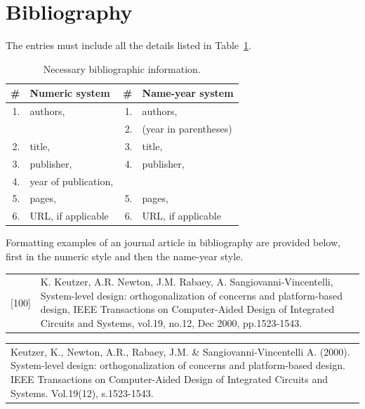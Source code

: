 \documentclass[12pt,a4paper,english
]{tunithesis}
\begin{document}
\section{Bibliography}
The entries must include all the details listed in Table~\ref{tab:bibl}.
\begin{table}[!ht]
  \small
  \begin{center}
    \caption{Necessary bibliographic information.}
    \label{tab:bibl}
    \begin{tabular}{r l | r l }
\hline 
\textbf{\#}  
   & \textbf{Numeric system}
                       & \textbf{\#}  
                                & \textbf{Name-year system}\\
\hline
\hline
1. &	authors,	   & 1. & authors,  \\
   &                       & 2. & (year in parentheses) \\
2. &	title,             & 3.	& title,    \\
3. &	publisher,         & 4.	& publisher,\\
4. &	year of publication, &  &	 \\
5. &	pages,             & 5.  & pages, \\
6. &	URL, if applicable & 6.	& URL, if applicable    \\
      \hline
    \end{tabular}
  \end{center}
\end{table}


Formatting examples of an journal article in bibliography are provided
below, first in the numeric style and then the name-year style.

\begin{tabular}{p{1cm}p{12cm}}
\small
[100] & K. Keutzer, A.R. Newton, J.M. Rabaey,
A. Sangiovanni-Vincentelli, System-level design: orthogonalization of
concerns and platform-based design, IEEE Transactions on
Computer-Aided Design of Integrated Circuits and Systems, vol.19,
no.12, Dec 2000, pp.1523-1543.\\
\end{tabular}

\begin{tabular}{p{13cm}}
\small
Keutzer, K., Newton, A.R., Rabaey, J.M. \& Sangiovanni-Vincentelli
A. (2000). System-level design: orthogonalization of concerns and
platform-based design. IEEE Transactions on Computer-Aided Design of
Integrated Circuits and Systems. Vol.19(12), s.1523-1543. \\
\end{tabular}
\end{document}
